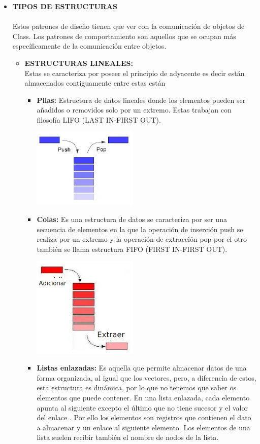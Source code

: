 \documentclass[twoside,twocolumn]{article}
\begin{document}
\begin{itemize}
	\item \textbf{TIPOS DE ESTRUCTURAS}
	\\
	\\Estos patrones de diseño tienen que ver con la comunicación de objetos de Class. Los patrones de comportamiento son aquellos que se ocupan más específicamente de la comunicación entre objetos.
	\begin{itemize}
		\item \textbf{ESTRUCTURAS LINEALES:} \\Estas se caracteriza por poseer el principio de adyacente es decir están almacenados contiguamente entre estas están
        \begin{itemize}
            \item \textbf{Pilas:} Estructura de datos lineales donde los elementos pueden ser añadidos o removidos solo por un extremo. Estas trabajan con filosofía LIFO (LAST IN-FIRST OUT).
            \begin{center}
                \includegraphics[width=5cm]{./img/1.png} 
            \end{center}
            \item \textbf{Colas:} Es una estructura de datos se caracteriza por ser una secuencia de elementos en la que la operación de inserción push se realiza por un extremo y la operación de extracción pop por el otro también se llama estructura FIFO (FIRST IN-FIRST OUT).
            \begin{center}
                \includegraphics[width=5cm]{./img/2.png} 
            \end{center}
            \item \textbf{Listas enlazadas:} Es aquella que permite almacenar datos de una forma organizada, al igual que los vectores, pero, a diferencia de estos, esta estructura es dinámica, por lo que no tenemos que saber os elementos que puede contener. En una lista enlazada, cada elemento apunta al siguiente excepto el último que no tiene sucesor y el valor del enlace . Por ello los elementos son registros que contienen el dato a almacenar y un enlace al siguiente elemento. Los elementos de una lista suelen recibir también el nombre de nodos de la lista.

\end{itemize}
\end{itemize}
\end{itemize}
\end{document}
